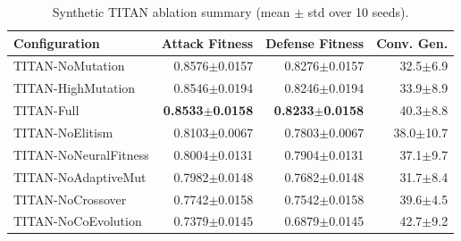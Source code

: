 \begin{table}[h]
\centering
\caption{Synthetic TITAN ablation summary (mean $\pm$ std over 10 seeds).}
\label{tab:ablation}
\begin{tabular}{lrrr}
\toprule
Configuration & Attack Fitness & Defense Fitness & Conv. Gen. \\
\midrule
TITAN-NoMutation & 0.8576$\pm$0.0157 & 0.8276$\pm$0.0157 & 32.5$\pm$6.9 \\
TITAN-HighMutation & 0.8546$\pm$0.0194 & 0.8246$\pm$0.0194 & 33.9$\pm$8.9 \\
TITAN-Full & \textbf{0.8533$\pm$0.0158} & \textbf{0.8233$\pm$0.0158} & 40.3$\pm$8.8 \\
TITAN-NoElitism & 0.8103$\pm$0.0067 & 0.7803$\pm$0.0067 & 38.0$\pm$10.7 \\
TITAN-NoNeuralFitness & 0.8004$\pm$0.0131 & 0.7904$\pm$0.0131 & 37.1$\pm$9.7 \\
TITAN-NoAdaptiveMut & 0.7982$\pm$0.0148 & 0.7682$\pm$0.0148 & 31.7$\pm$8.4 \\
TITAN-NoCrossover & 0.7742$\pm$0.0158 & 0.7542$\pm$0.0158 & 39.6$\pm$4.5 \\
TITAN-NoCoEvolution & 0.7379$\pm$0.0145 & 0.6879$\pm$0.0145 & 42.7$\pm$9.2 \\
\bottomrule
\end{tabular}
\end{table}